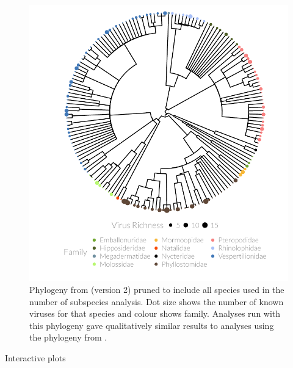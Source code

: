 \begin{knitrout}\footnotesize
{}\color{fgcolor}\begin{figure}[t]

{\centering \includegraphics[width=1\textwidth,trim = 0cm 0cm 0cm 0cm]{figure/A-treePlot2-1} 

}

\caption[Pruned alternative phylogeny with dot size showing number of pathogens and colour showing family.]{
Phylogeny from \textcite{jones2005bats} (version 2) pruned to include all species used in the number of subspecies analysis.
Dot size shows the number of known viruses for that species and colour shows family.
Analyses run with this phylogeny gave qualitatively similar results to analyses using the phylogeny from \cite{bininda2007delayed}.
}\label{fig:treePlot2}
\end{figure}


\end{knitrout}






Interactive plots







